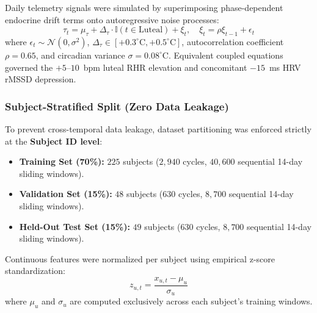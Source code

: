 \documentclass[conference]{IEEEtran}
\begin{document}
Daily telemetry signals were simulated by superimposing phase-dependent endocrine drift terms onto autoregressive noise processes:
\begin{equation}
\tau_t = \mu_{\tau} + \Delta_{\tau} \cdot \mathbb{I}(t \in \text{Luteal}) + \xi_t, \quad \xi_t = \rho \xi_{t-1} + \epsilon_t
\end{equation}
where $\epsilon_t \sim \mathcal{N}(0, \sigma^2)$, $\Delta_{\tau} \in [+0.3^\circ\text{C}, +0.5^\circ\text{C}]$, autocorrelation coefficient $\rho = 0.65$, and circadian variance $\sigma = 0.08^\circ$C. Equivalent coupled equations governed the $+5$--$10$~bpm luteal RHR elevation and concomitant $-15$~ms HRV rMSSD depression.

\subsubsection{Subject-Stratified Split (Zero Data Leakage)}
To prevent cross-temporal data leakage, dataset partitioning was enforced strictly at the \textbf{Subject ID level}:
\begin{itemize}
    \item \textbf{Training Set (70\%):} $225$ subjects ($2{,}940$ cycles, $40{,}600$ sequential 14-day sliding windows).
    \item \textbf{Validation Set (15\%):} $48$ subjects ($630$ cycles, $8{,}700$ sequential 14-day sliding windows).
    \item \textbf{Held-Out Test Set (15\%):} $49$ subjects ($630$ cycles, $8{,}700$ sequential 14-day sliding windows).
\end{itemize}

Continuous features were normalized per subject using empirical z-score standardization:
\begin{equation}
z_{u,t} = \frac{x_{u,t} - \mu_u}{\sigma_u}
\end{equation}
where $\mu_u$ and $\sigma_u$ are computed exclusively across each subject's training windows.
\end{document}
